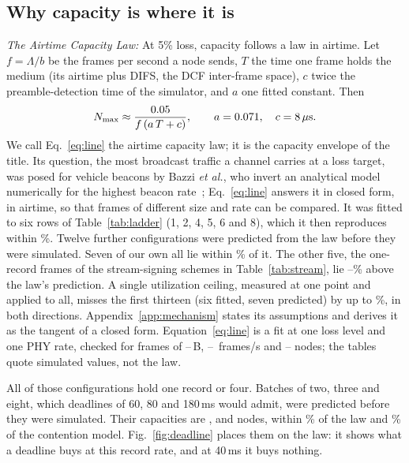\documentclass[lineno,pdflatex,sn-mathphys-num]{sn-jnl}
\newcommand{\runin}[1]{\textit{#1:}}
\renewcommand{\_}{\authbcunderscore\allowbreak}
\begin{document}
\subsection{Why capacity is where it is}\label{sec:mechanism}

\runin{The Airtime Capacity Law} At 5\% loss, capacity follows a law in airtime. Let $f =
\Lambda/b$ be the frames per second a node sends, $T$ the time one frame holds the medium (its
airtime plus DIFS, the DCF inter-frame space), $c$ twice the preamble-detection time of the
simulator, and $a$ one fitted constant. Then
\begin{equation}
N_{\max} \approx \frac{0.05}{f\,(a\,T + c)}, \qquad a = 0.071,\quad c = 8\,\mu\mathrm{s}.
\label{eq:line}
\end{equation}
We call Eq.~\eqref{eq:line} the airtime capacity law; it is the capacity envelope of the title.
Its question, the most broadcast traffic a channel carries at a loss target, was posed for
vehicle beacons by Bazzi \emph{et al.}, who invert an analytical model numerically for the
highest beacon rate~\cite{bazzi2016beaconing}; Eq.~\eqref{eq:line} answers it in closed form, in
airtime, so that frames of different size and rate can be compared.
It was fitted to six rows of Table~\ref{tab:ladder} (1, 2, 4, 5, 6 and 8), which it then
reproduces within \lineFitWorst\%. Twelve further configurations were predicted from the law
before they were simulated. Seven of our own all lie within \lineWorst\% of it.
The other five, the one-record frames of the stream-signing schemes in
Table~\ref{tab:stream}, lie \lineStreamLeast--\lineStreamWorst\% above the law's prediction.
A single utilization ceiling, measured at one point and applied to all, misses the first thirteen
(six fitted, seven predicted) by up to \lineCeilWorst\%, in both directions.
Appendix~\ref{app:mechanism} states its assumptions and derives it as the tangent of a closed
form. Equation~\eqref{eq:line} is a fit at one loss level and one PHY rate, checked for frames of
\lineFrameLo--\lineFrameHi\,B, \lineFpsLo--\lineFpsHi~frames/s and \lineNlo--\lineNhi{} nodes;
the tables quote simulated values, not the law.

All of those configurations hold one record or four. Batches of two, three and eight, which
deadlines of 60, 80 and 180\,ms would admit, were predicted before they were simulated. Their
capacities are \batNsTwo, \batNsThree{} and \batNsEight{} nodes, within \batLineWorst\% of the
law and \batModelWorst\% of the contention model. Fig.~\ref{fig:deadline} places them on the law:
it shows what a deadline buys at this record rate, and at 40\,ms it buys nothing.
\end{document}
